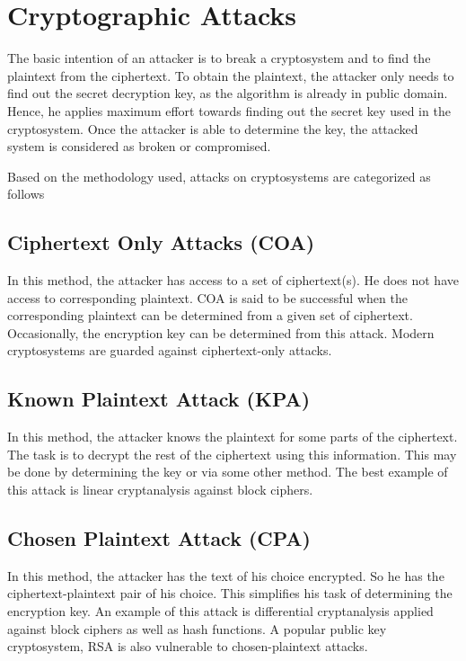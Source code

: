 \documentclass[british]{report}
\begin{document}
\pagebreak{}

\section{Cryptographic Attacks}

The basic intention of an attacker is to break a cryptosystem and
to find the plaintext from the ciphertext. To obtain the plaintext,
the attacker only needs to find out the secret decryption key, as
the algorithm is already in public domain. Hence, he applies maximum
effort towards finding out the secret key used in the cryptosystem.
Once the attacker is able to determine the key, the attacked system
is considered as broken or compromised.

Based on the methodology used, attacks on cryptosystems are categorized
as follows \textminus{}

\subsection{Ciphertext Only Attacks (COA) }

In this method, the attacker has access to a set of ciphertext(s).
He does not have access to corresponding plaintext. COA is said to
be successful when the corresponding plaintext can be determined from
a given set of ciphertext. Occasionally, the encryption key can be
determined from this attack. Modern cryptosystems are guarded against
ciphertext-only attacks.

\subsection{Known Plaintext Attack (KPA)}

In this method, the attacker knows the plaintext for some parts of
the ciphertext. The task is to decrypt the rest of the ciphertext
using this information. This may be done by determining the key or
via some other method. The best example of this attack is linear cryptanalysis
against block ciphers.

\subsection{Chosen Plaintext Attack (CPA)}

In this method, the attacker has the text of his choice encrypted.
So he has the ciphertext-plaintext pair of his choice. This simplifies
his task of determining the encryption key. An example of this attack
is differential cryptanalysis applied against block ciphers as well
as hash functions. A popular public key cryptosystem, RSA is also
vulnerable to chosen-plaintext attacks.
\end{document}
